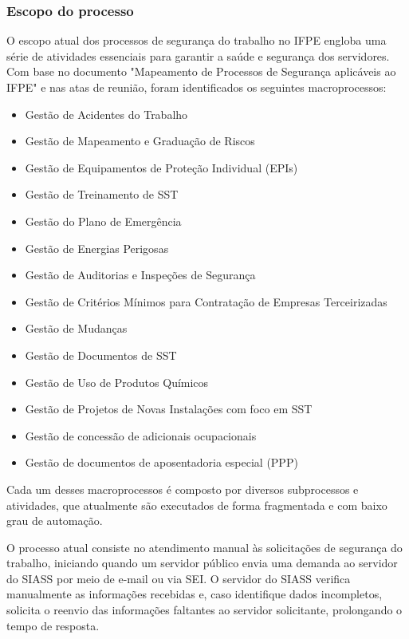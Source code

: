 \documentclass[12pt,a4paper]{article}
\begin{document}
\subsubsection{Escopo do processo}
O escopo atual dos processos de segurança do trabalho no IFPE engloba uma série de atividades essenciais para garantir a saúde e segurança dos servidores. Com base no documento "Mapeamento de Processos de Segurança aplicáveis ao IFPE" e nas atas de reunião, foram identificados os seguintes macroprocessos:

\begin{itemize}
    \item Gestão de Acidentes do Trabalho
    \item Gestão de Mapeamento e Graduação de Riscos
    \item Gestão de Equipamentos de Proteção Individual (EPIs)
    \item Gestão de Treinamento de SST
    \item Gestão do Plano de Emergência
    \item Gestão de Energias Perigosas
    \item Gestão de Auditorias e Inspeções de Segurança
    \item Gestão de Critérios Mínimos para Contratação de Empresas Terceirizadas
    \item Gestão de Mudanças
    \item Gestão de Documentos de SST
    \item Gestão de Uso de Produtos Químicos
    \item Gestão de Projetos de Novas Instalações com foco em SST
    \item Gestão de concessão de adicionais ocupacionais
    \item Gestão de documentos de aposentadoria especial (PPP)
\end{itemize}

Cada um desses macroprocessos é composto por diversos subprocessos e atividades, que atualmente são executados de forma fragmentada e com baixo grau de automação.

O processo atual consiste no atendimento manual às solicitações de segurança do trabalho, iniciando quando um servidor público envia uma demanda ao servidor do SIASS por meio de e-mail ou via SEI. O servidor do SIASS verifica manualmente as informações recebidas e, caso identifique dados incompletos, solicita o reenvio das informações faltantes ao servidor solicitante, prolongando o tempo de resposta.
\end{document}
